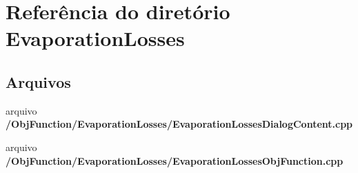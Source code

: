 \section{Referência do diretório Evaporation\+Losses}
\label{dir_6ebad64095f4be0656ef23f5d5421aba}
\subsection*{Arquivos}
\begin{DoxyCompactItemize}
\item 
arquivo {\bf /\+Obj\+Function/\+Evaporation\+Losses/\+Evaporation\+Losses\+Dialog\+Content.\+cpp}
\item 
arquivo {\bf /\+Obj\+Function/\+Evaporation\+Losses/\+Evaporation\+Losses\+Obj\+Function.\+cpp}
\end{DoxyCompactItemize}
